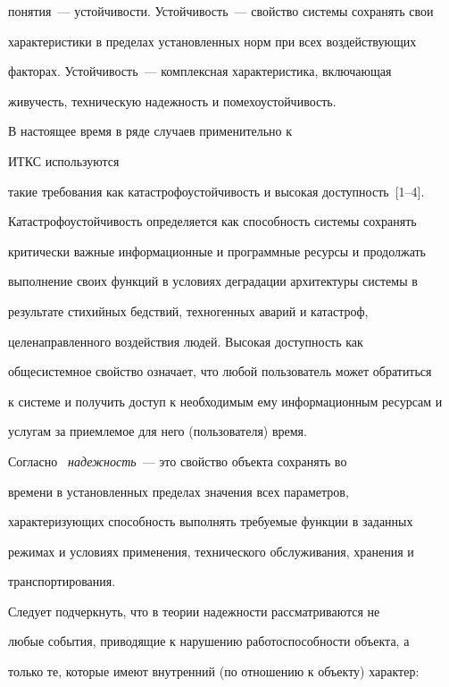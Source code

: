 понятия~--- устойчивости. Устойчивость~--- свойство системы сохранять свои 


характеристики в пределах установленных норм при всех воздействующих 


факторах. Устойчивость~--- комплексная характеристика, включающая 


живучесть, техническую надежность и помехоустойчивость.


     


     В настоящее время в ряде случаев применительно к 


     ИТКС используются 


такие требования как  катастрофоустойчивость и высокая доступность~[1--4].  


Катастрофоустойчивость определяется как способность системы сохранять 


критически важные информационные и программные ресурсы и продолжать 


выполнение своих функций в условиях деградации архитектуры системы в 


результате стихийных бедствий, техногенных аварий и катастроф, 


целенаправленного воздействия людей. Высокая доступность как 


общесистемное свойство означает, что любой пользователь может обратиться 


к системе и получить доступ к необходимым ему информационным ресурсам и 


услугам за приемлемое для него (пользователя) время.


     


     Согласно~\cite{6-2-3} \textit{надежность}~--- это свойство объекта сохранять во 


времени в установленных пределах значения всех параметров, 


характеризующих способность выполнять требуемые функции в заданных 


режимах и условиях применения, технического обслуживания, хранения и 


транспортирования.


     


     Следует подчеркнуть, что в теории надежности рассматриваются не 


любые события, приводящие к нарушению работоспособности объекта, а 


только те, которые имеют внутренний (по отношению к объекту) характер: 


